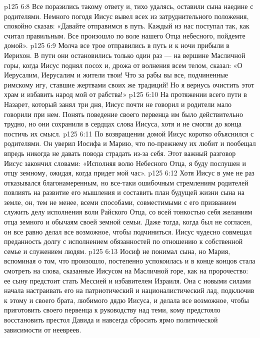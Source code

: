 \vs p125 6:8 Все поразились такому ответу и, тихо удалясь, оставили сына наедине с родителями. Немного погодя Иисус вывел всех из затруднительного положения, спокойно сказав: «Давайте отправимся в путь. Каждый из нас поступал так, как считал правильным. Все произошло по воле нашего Отца небесного, пойдемте домой».
\vs p125 6:9 Молча все трое отправились в путь и к ночи прибыли в Иерихон. В пути они остановились только один раз --- на вершине Масличной горы, когда Иисус поднял посох и, дрожа от волнения всем телом, сказал: «О Иерусалим, Иерусалим и жители твои! Что за рабы вы все, подчиненные римскому игу, ставшие жертвами своих же традиций! Но я вернусь очистить этот храм и избавить народ мой от рабства!»
\vs p125 6:10 На протяжении всего пути в Назарет, который занял три дня, Иисус почти не говорил и родители мало говорили при нем. Понять поведение своего первенца им было действительно трудно, но они сохранили в сердцах слова Иисуса, хотя и не смогли до конца постичь их смысл.
\vs p125 6:11 По возвращении домой Иисус коротко объяснился с родителями. Он уверил Иосифа и Марию, что по\hyp{}прежнему их любит и пообещал впредь никогда не давать повода страдать из\hyp{}за себя. Этот важный разговор Иисус закончил словами: «Исполняя волю Небесного Отца, я буду послушен и отцу земному, ожидая, когда придет мой час».
\vs p125 6:12 \pc Хотя Иисус в уме не раз отказывался  благонамеренным, но все\hyp{}таки ошибочным стремлениям родителей повлиять на развитие его мышления и составить план будущей жизни сына на земле, он, тем не менее, всеми способами, совместимыми с его призванием служить делу исполнения воли Райского Отца, со всей тонкостью  себя желаниям отца земного и обычаям своей земной семьи. Даже тогда, когда был не согласен, он все равно делал все возможное, чтобы подчиниться. Иисус чудесно совмещал преданность долгу с исполнением обязанностей по отношению к собственной семье и служением людям.
\vs p125 6:13 \pc Иосиф не понимал сына, но Мария, вспоминая о том, что произошло, постепенно успокоилась и в конце концов стала смотреть на слова, сказанные Иисусом на Масличной горе, как на пророчество: ее сыну предстоит стать Мессией и избавителем Израиля. Она с новыми силами начала настраивать его на патриотический и националистический лад, подключив к этому и своего брата, любимого дядю Иисуса, и делала все возможное, чтобы приготовить своего первенца к руководству над теми, кому предстояло восстановить престол Давида и навсегда сбросить ярмо политической зависимости от неевреев.
